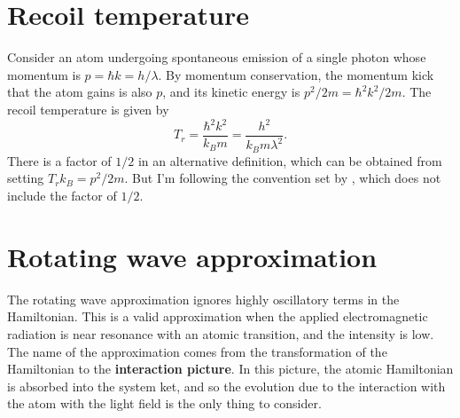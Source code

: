 \documentclass{book}
\theoremstyle{definition}
\newcommand{\f}[2]{\frac{#1}{#2}}
\begin{document}
\section*{Recoil temperature}

Consider an atom undergoing spontaneous emission of a single photon whose momentum is $p = \hbar k = h/\lambda$. By momentum conservation, the momentum kick that the atom gains is also $p$, and its kinetic energy is $p^2/2m = \hbar^2k^2/2m$. The recoil temperature is given by 
\begin{equation*}
T_r = \f{\hbar^2k^2}{k_Bm} = \f{h^2}{k_B m \lambda^2}.
\end{equation*} 
There is a factor of $1/2$ in an alternative definition, which can be obtained from setting $T_r k_B = p^2/2m$. But I'm following the convention set by \cite{metcalf2007laser}, which does not include the factor of $1/2$.






\section*{Rotating wave approximation}


The rotating wave approximation ignores highly oscillatory terms in the Hamiltonian. This is a valid approximation when the applied electromagnetic radiation is near resonance with an atomic transition, and the intensity is low. The name of the approximation comes from the transformation of the Hamiltonian to the \textbf{interaction picture}. In this picture, the atomic Hamiltonian is absorbed into the system ket, and so the evolution due to the interaction with the atom with the light field is the only thing to consider. \\
\end{document}
